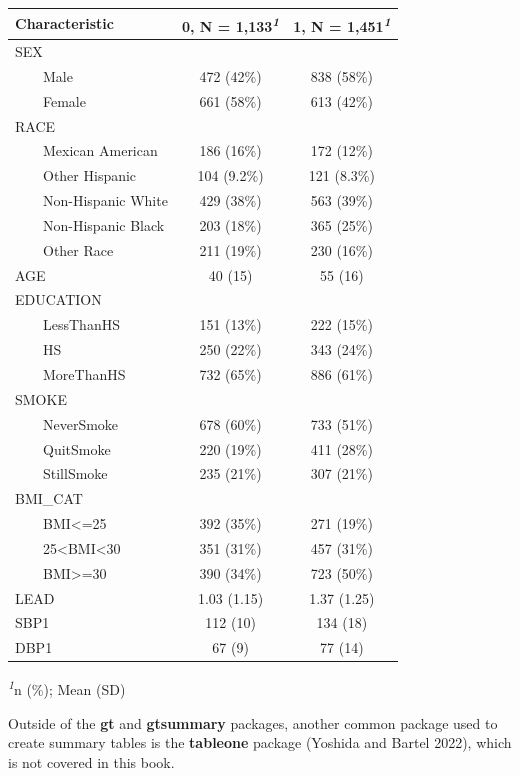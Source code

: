 \documentclass[
  letterpaper,
]{latex/krantz}
\begin{document}
\setlength{\LTpost}{0mm}
\begin{longtable*}{lcc}
\toprule
\textbf{Characteristic} & \textbf{0}, N = 1,133\textsuperscript{\textit{1}} & \textbf{1}, N = 1,451\textsuperscript{\textit{1}} \\ 
\midrule\addlinespace[2.5pt]
SEX &  &  \\ 
    Male & 472 (42\%) & 838 (58\%) \\ 
    Female & 661 (58\%) & 613 (42\%) \\ 
RACE &  &  \\ 
    Mexican American & 186 (16\%) & 172 (12\%) \\ 
    Other Hispanic & 104 (9.2\%) & 121 (8.3\%) \\ 
    Non-Hispanic White & 429 (38\%) & 563 (39\%) \\ 
    Non-Hispanic Black & 203 (18\%) & 365 (25\%) \\ 
    Other Race & 211 (19\%) & 230 (16\%) \\ 
AGE & 40 (15) & 55 (16) \\ 
EDUCATION &  &  \\ 
    LessThanHS & 151 (13\%) & 222 (15\%) \\ 
    HS & 250 (22\%) & 343 (24\%) \\ 
    MoreThanHS & 732 (65\%) & 886 (61\%) \\ 
SMOKE &  &  \\ 
    NeverSmoke & 678 (60\%) & 733 (51\%) \\ 
    QuitSmoke & 220 (19\%) & 411 (28\%) \\ 
    StillSmoke & 235 (21\%) & 307 (21\%) \\ 
BMI\_CAT &  &  \\ 
    BMI<=25 & 392 (35\%) & 271 (19\%) \\ 
    25<BMI<30 & 351 (31\%) & 457 (31\%) \\ 
    BMI>=30 & 390 (34\%) & 723 (50\%) \\ 
LEAD & 1.03 (1.15) & 1.37 (1.25) \\ 
SBP1 & 112 (10) & 134 (18) \\ 
DBP1 & 67 (9) & 77 (14) \\ 
\bottomrule
\end{longtable*}
\begin{minipage}{\linewidth}
\textsuperscript{\textit{1}}n (\%); Mean (SD)\\
\end{minipage}

Outside of the \textbf{gt} and \textbf{gtsummary} packages, another
common package used to create summary tables is the \textbf{tableone}
 package (Yoshida and Bartel 2022), which is
not covered in this book.
\end{document}
